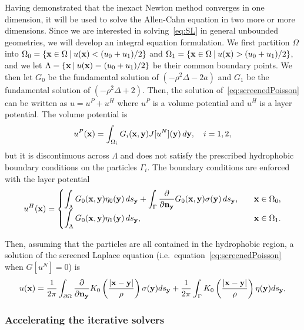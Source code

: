 Having demonstrated that the inexact Newton method converges in one
dimension, it will be used to solve the Allen-Cahn equation in two more
or more dimensions. Since we are interested in solving~\eqref{eq:SL} in
general unbounded geometries, we will develop an integral equation
formulation. We first partition $\Omega$ into $\Omega_0 = \{\mathbf{x} \in
\Omega \:|\: u(\mathbf{x}) < (u_0 + u_1)/2\}$ and $\Omega_1 = \{\mathbf{x} \in \Omega
\:|\: u(\mathbf{x}) > (u_0 + u_1)/2\}$, and we let $\Lambda = \{\mathbf{x} \:|\:
u(\mathbf{x}) = (u_0 + u_1)/2 \}$ be their common boundary points. We then let
$G_0$ be the fundamental solution of $(-\rho^2 \Delta - 2a)$ and $G_1$
be the fundamental solution of $(-\rho^2 \Delta + 2)$. Then, the
solution of~\eqref{eq:screenedPoisson} can be written as $u = u^P + u^H$
where $u^P$ is a volume potential and $u^H$ is a layer potential. The
volume potential is
\begin{align*}
  u^{P}(\mathbf{x}) = \int_{\Omega_i} G_i(\mathbf{x},\mathbf{y}) J[u^N](\mathbf{y})\, d\mathbf{y}, 
    \quad i = 1,2,
\end{align*}
but it is discontinuous across $\Lambda$ and does not satisfy the
prescribed hydrophobic boundary conditions on the particles $\Gamma_i$.
The boundary conditions are enforced with the layer potential
\begin{align*}
  u^{H}(\mathbf{x}) = \begin{cases}
    \displaystyle\int_{\Lambda} G_0(\mathbf{x},\mathbf{y}) \eta_0(\mathbf{y}) \, ds_{\mathbf{y}} + 
    \displaystyle\int_{\Gamma} \frac{\partial }{\partial \mathbf{n}_{\mathbf{y}}} G_0(\mathbf{x},\mathbf{y})
      \sigma(\mathbf{y}) \,ds_{\mathbf{y}}, \quad & \mathbf{x} \in \Omega_0, \\
    \displaystyle\int_{\Lambda} G_0(\mathbf{x},\mathbf{y}) \eta_1(\mathbf{y}) \, ds_{\mathbf{y}},
     & \mathbf{x} \in \Omega_1.
  \end{cases}
\end{align*}

Then, assuming that the particles are all contained in the
hydrophobic region, a solution of the screened Laplace equation
(i.e.~equation~\eqref{eq:screenedPoisson} when $G[u^N] = 0$) is
\begin{align*}
  u(\mathbf{x}) = \frac{1}{2\pi} \int_{\partial\Omega} \frac{\partial }{\partial \mathbf{n}_{\mathbf{y}}} K_0 \left(
    \frac{|\mathbf{x} - \mathbf{y}|}{\rho}\right) \sigma(\mathbf{y}) ds_{\mathbf{y}} + 
    \frac{1}{2\pi} \int_{\Gamma} K_0 \left(
    \frac{|\mathbf{x} - \mathbf{y}|}{\rho} \right) \eta(\mathbf{y}) ds_{\mathbf{y}},
\end{align*}



\subsubsection{Accelerating the iterative solvers}
\label{subsec:NumericalIssues}

